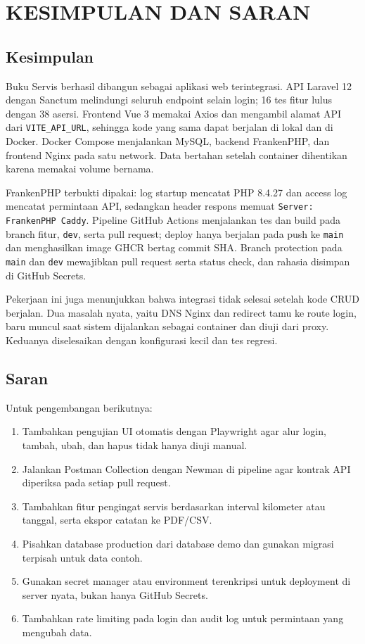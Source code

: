 \documentclass[12pt,a4paper,oneside]{book}
\begin{document}
\chapter{KESIMPULAN DAN SARAN}
\label{chap:kesimpulan}

\section{Kesimpulan}

Buku Servis berhasil dibangun sebagai aplikasi web terintegrasi. API Laravel 12
dengan Sanctum melindungi seluruh endpoint selain login; 16 tes fitur lulus dengan
38 asersi. Frontend Vue 3 memakai Axios dan mengambil alamat API dari
\texttt{VITE\_API\_URL}, sehingga kode yang sama dapat berjalan di lokal dan di
Docker. Docker Compose menjalankan MySQL, backend FrankenPHP, dan frontend Nginx
pada satu network. Data bertahan setelah container dihentikan karena memakai volume
bernama.

FrankenPHP terbukti dipakai: log startup mencatat PHP 8.4.27 dan access log mencatat
permintaan API, sedangkan header respons memuat \texttt{Server: FrankenPHP Caddy}.
Pipeline GitHub Actions menjalankan tes dan build pada branch fitur, \texttt{dev},
serta pull request; deploy hanya berjalan pada push ke \texttt{main} dan menghasilkan
image GHCR bertag commit SHA. Branch protection pada \texttt{main} dan \texttt{dev}
mewajibkan pull request serta status check, dan rahasia disimpan di GitHub Secrets.

Pekerjaan ini juga menunjukkan bahwa integrasi tidak selesai setelah kode CRUD
berjalan. Dua masalah nyata, yaitu DNS Nginx dan redirect tamu ke route login,
baru muncul saat sistem dijalankan sebagai container dan diuji dari proxy. Keduanya
diselesaikan dengan konfigurasi kecil dan tes regresi.

\section{Saran}

Untuk pengembangan berikutnya:

\begin{enumerate}[leftmargin=1.2cm]
  \item Tambahkan pengujian UI otomatis dengan Playwright agar alur login, tambah,
        ubah, dan hapus tidak hanya diuji manual.
  \item Jalankan Postman Collection dengan Newman di pipeline agar kontrak API
        diperiksa pada setiap pull request.
  \item Tambahkan fitur pengingat servis berdasarkan interval kilometer atau
        tanggal, serta ekspor catatan ke PDF/CSV.
  \item Pisahkan database production dari database demo dan gunakan migrasi
        terpisah untuk data contoh.
  \item Gunakan secret manager atau environment terenkripsi untuk deployment di
        server nyata, bukan hanya GitHub Secrets.
  \item Tambahkan rate limiting pada login dan audit log untuk permintaan yang
        mengubah data.
\end{enumerate}
\end{document}
